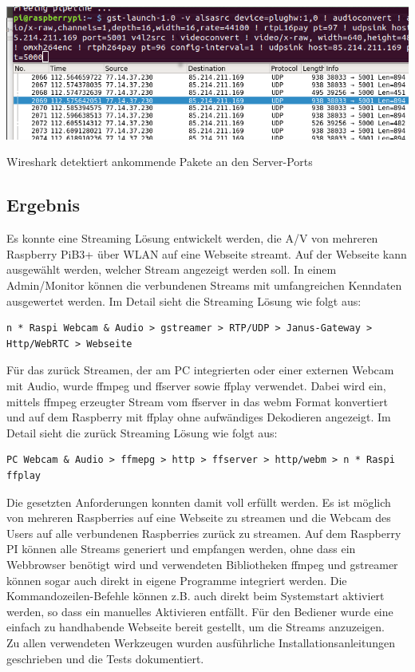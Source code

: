 \begin{minipage}{\textwidth}
    \begin{center}
        \includegraphics[scale=0.7]{img/wireshark.png} 
    \end{center}
\end{minipage}

\begin{center}
Wireshark detektiert ankommende Pakete an den Server-Ports
\end{center}

\subsection{Ergebnis}
Es konnte eine Streaming Lösung entwickelt werden, die A/V von mehreren Raspberry PiB3+ über WLAN auf eine Webseite streamt. Auf der Webseite kann ausgewählt werden, welcher Stream angezeigt werden soll. In einem Admin/Monitor können die verbundenen Streams mit umfangreichen Kenndaten ausgewertet werden. Im Detail sieht die Streaming Lösung wie folgt aus:
\begin{verbatim}
n * Raspi Webcam & Audio > gstreamer > RTP/UDP > Janus-Gateway > Http/WebRTC > Webseite
\end{verbatim}

Für das zurück Streamen, der am PC integrierten oder einer externen Webcam mit Audio, wurde ffmpeg und ffserver sowie ffplay verwendet. Dabei wird ein, mittels ffmpeg erzeugter Stream vom ffserver in das webm Format konvertiert und auf dem Raspberry mit ffplay ohne aufwändiges Dekodieren angezeigt. Im Detail sieht die zurück Streaming Lösung wie folgt aus:
\begin{verbatim}
PC Webcam & Audio > ffmepg > http > ffserver > http/webm > n * Raspi ffplay
\end{verbatim}

Die gesetzten Anforderungen konnten damit voll erfüllt werden. Es ist möglich von mehreren Raspberries auf eine Webseite zu streamen und die Webcam des Users auf alle verbundenen Raspberries zurück zu streamen. Auf dem Raspberry PI können alle Streams generiert und empfangen werden, ohne dass ein Webbrowser benötigt wird und verwendeten Bibliotheken ffmpeg und gstreamer können sogar auch direkt in eigene Programme integriert werden. Die Kommandozeilen-Befehle können z.B. auch direkt beim Systemstart aktiviert werden, so dass ein manuelles Aktivieren entfällt. Für den Bediener wurde eine einfach zu handhabende Webseite bereit gestellt, um die Streams anzuzeigen. \\
Zu allen verwendeten Werkzeugen wurden ausführliche Installationsanleitungen geschrieben und die Tests dokumentiert.\\

